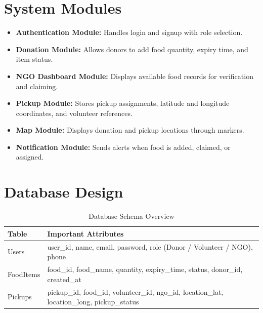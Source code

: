 \documentclass[12pt,a4paper]{report}
\begin{document}
\section{System Modules}
\begin{itemize}[leftmargin=1.2cm]
\item \textbf{Authentication Module:} Handles login and signup with role selection.
\item \textbf{Donation Module:} Allows donors to add food quantity, expiry time, and item status.
\item \textbf{NGO Dashboard Module:} Displays available food records for verification and claiming.
\item \textbf{Pickup Module:} Stores pickup assignments, latitude and longitude coordinates, and volunteer references.
\item \textbf{Map Module:} Displays donation and pickup locations through markers.
\item \textbf{Notification Module:} Sends alerts when food is added, claimed, or assigned.
\end{itemize}

\section{Database Design}
\begin{table}[H]
\centering
\caption{Database Schema Overview}
\renewcommand{\arraystretch}{1.4}
\begin{tabular}{@{} p{3cm} p{9.8cm} @{}}
\toprule
\textbf{Table} & \textbf{Important Attributes} \\
\midrule
Users & user\_id, name, email, password, role (Donor / Volunteer / NGO), phone \\
FoodItems & food\_id, food\_name, quantity, expiry\_time, status, donor\_id, created\_at \\
Pickups & pickup\_id, food\_id, volunteer\_id, ngo\_id, location\_lat, location\_long, pickup\_status \\
\bottomrule
\end{tabular}
\end{table}
\end{document}
